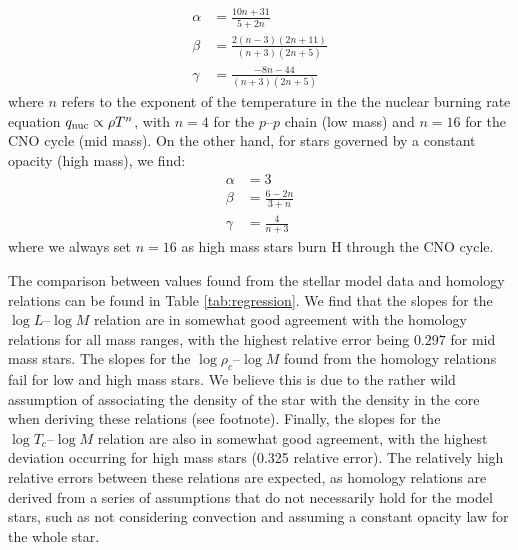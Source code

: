 \begin{align}
    \alpha & = \frac{10n +31}{5 + 2n}                                                              \\
    \beta  & =  \frac{2\left(n-3 \right)\left(2n+11 \right)}{\left(n+3 \right)\left(2n+ 5 \right)} \\
    \gamma & = \frac{-8n - 44}{\left(n+3 \right)\left(2n+ 5 \right)}
\end{align}
where $n$ refers to the exponent of the temperature in the the nuclear burning rate equation $q_{\rm nuc} \propto \rho T^n $, with $n=4$ for the $p\text{--}p$ chain (low mass) and $n=16$ for the CNO cycle (mid mass). On the other hand, for stars governed by a constant opacity (high mass), we find:
\begin{align}
    \alpha & = 3                 \\
    \beta  & =  \frac{6-2n}{3+n} \\
    \gamma & =  \frac{4}{n+3}
\end{align}
where we always set $n=16$ as high mass stars burn H through the CNO cycle.

The comparison between values found from the stellar model data and homology relations can be found in Table \ref{tab:regression}. We find that the slopes for the $\log L \text{--} \log M$ relation are in somewhat good agreement with the homology relations for all mass ranges, with the highest relative error being $0.297$ for mid mass stars.
The slopes for the $\log \rho_c \text{--} \log M$ found from the homology relations fail for low and high mass stars. We believe this is due to the rather wild assumption of associating the density of the star with the density in the core when deriving these relations (see footnote).
Finally, the slopes for the $\log T_c \text{--} \log M$ relation are also in somewhat good agreement, with the highest deviation occurring for high mass stars (0.325 relative error). The relatively high relative errors between these relations are expected, as homology relations are derived from a series of assumptions that do not necessarily hold for the model stars, such as not considering convection and assuming a constant opacity law for the whole star.



